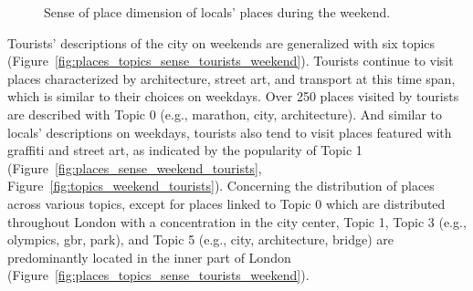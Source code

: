 \documentclass{article}
\theoremstyle{remark}
\begin{document}
\begin{figure}[!h]
    \caption{Sense of place dimension of locals' places during the weekend.}
    \label{fig:places_topics_sense_locals_weekend}
\end{figure}

Tourists' descriptions of the city on weekends are generalized with six topics (Figure~\ref{fig:places_topics_sense_tourists_weekend}). Tourists continue to visit places characterized by architecture, street art, and transport at this time span, which is similar to their choices on weekdays. Over 250 places visited by tourists are described with Topic 0 (e.g., marathon, city, architecture). And similar to locals' descriptions on weekdays, tourists also tend to visit places featured with graffiti and street art, as indicated by the popularity of Topic 1 (Figure~\ref{fig:places_sense_weekend_tourists}, Figure~\ref{fig:topics_weekend_tourists}). Concerning the distribution of places across various topics, except for places linked to Topic 0 which are distributed throughout London with a concentration in the city center, Topic 1, Topic 3 (e.g., olympics, gbr, park), and Topic 5 (e.g., city, architecture, bridge) are predominantly located in the inner part of London (Figure~\ref{fig:places_topics_sense_tourists_weekend}).
\end{document}
